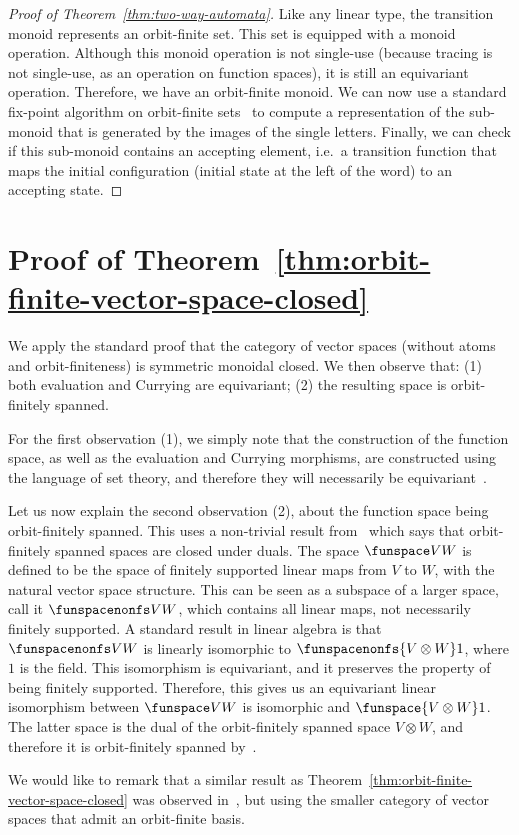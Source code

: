 \begin{proof}[Proof of Theorem~\ref{thm:two-way-automata}]
        Like any linear type, the transition monoid represents an orbit-finite set. This set is equipped with a monoid operation. Although this monoid operation is not single-use (because tracing is not single-use, as an operation on function spaces), it is still an equivariant operation. Therefore, we have an orbit-finite monoid. We can now use a standard fix-point algorithm on orbit-finite sets~\cite{bojanczyk_slightly2018} to compute a representation of the sub-monoid that is generated by the images of the single letters. Finally, we can check if this sub-monoid contains an accepting element, i.e.~a transition function that maps the initial configuration (initial state at the left of the word) to an accepting state. 
\end{proof}

\section{Proof of Theorem~\ref{thm:orbit-finite-vector-space-closed}}
 We apply the standard proof that the category of vector spaces (without atoms and orbit-finiteness) is symmetric monoidal closed. We then observe that: (1) both evaluation and Currying are equivariant; (2) the resulting space is orbit-finitely spanned. 
    
    For the first observation (1), we simply note that the construction of the function space, as well as  the evaluation and Currying morphisms, are constructed using the language of set theory, and therefore they will necessarily be equivariant~\cite[Equivariance Principle]{bojanczyk_slightly2018}.

    Let us now explain the second observation (2), about the function space being orbit-finitely spanned. This uses a non-trivial result from~\cite{bojanczykKM21OrbitFiniteVector} which says that orbit-finitely spanned spaces are closed under duals. 
    The space $\funspace V W$ is defined to be the space of finitely supported linear maps from $V$ to $W$, with the natural vector space structure. This can be seen as a subspace of a larger space, call it $\funspacenonfs V W$, which contains all linear maps, not necessarily finitely supported. A standard result in linear algebra is that $\funspacenonfs V W$ is linearly isomorphic to $ \funspacenonfs {V \otimes W} 1$, where $1$ is the field. This isomorphism is equivariant, and it preserves the property of being finitely supported. Therefore, this gives us an equivariant linear isomorphism between $\funspace V W$ is isomorphic and $ \funspace {V \otimes W} 1$. The latter space is the dual of the orbit-finitely spanned space $V \otimes W$, and therefore it is orbit-finitely spanned by~\cite[Corollary VI.5]{bojanczykKM21OrbitFiniteVector}.


    We would like to remark that a similar result as Theorem~\ref{thm:orbit-finite-vector-space-closed} was observed in~\cite[Theorem 3.8]{przybyłek2024note}, but using the smaller category of vector spaces that admit an orbit-finite basis. 
